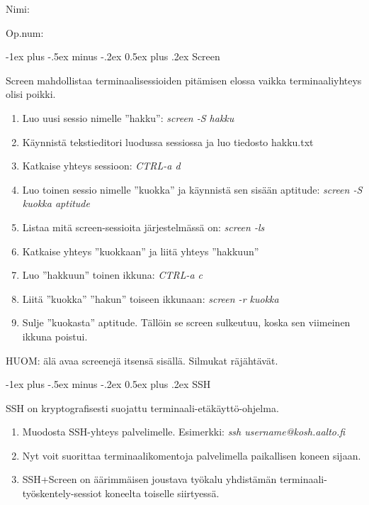 \documentclass[12pt,portrait,a4]{article}
\makeatletter
\renewcommand{\section}{\@startsection{section}{1}{0mm}%
                                {-1ex plus -.5ex minus -.2ex}%
                                {0.5ex plus .2ex}%
                                {\normalfont\large\bfseries}}
\makeatother
\begin{document}
\raggedbottom

\begin{multicols}{2}
\setlength{\premulticols}{1pt}
\setlength{\postmulticols}{1pt}
\setlength{\multicolsep}{1pt}
\setlength{\columnsep}{2pt}

Nimi:\hrulefill

Op.num:\hrulefill

\end{multicols}

\section{Screen}

Screen mahdollistaa terminaalisessioiden pitämisen elossa
vaikka terminaaliyhteys olisi poikki.

\begin{enumerate}
\item Luo uusi sessio nimelle ''hakku'': \emph{screen -S hakku}
\item Käynnistä tekstieditori luodussa sessiossa ja luo tiedosto hakku.txt
\item Katkaise yhteys sessioon: \emph{CTRL-a d}
\item Luo toinen sessio nimelle ''kuokka'' ja käynnistä sen sisään aptitude: \emph{screen -S kuokka aptitude}
\item Listaa mitä screen-sessioita järjestelmässä on: \emph{screen -ls}
\item Katkaise yhteys ''kuokkaan'' ja liitä yhteys ''hakkuun''
\item Luo ''hakkuun'' toinen ikkuna: \emph{CTRL-a c}
\item Liitä ''kuokka'' ''hakun'' toiseen ikkunaan: \emph{screen -r kuokka}
\item Sulje ''kuokasta'' aptitude.  Tällöin se screen sulkeutuu, koska sen
viimeinen ikkuna poistui.
\end{enumerate}

HUOM: älä avaa screenejä itsensä sisällä.  Silmukat räjähtävät.

\section{SSH}

SSH on kryptografisesti suojattu terminaali-etäkäyttö-ohjelma.

\begin{enumerate}
\item Muodosta SSH-yhteys palvelimelle.  Esimerkki: \emph{ssh username@kosh.aalto.fi}
\item Nyt voit suorittaa terminaalikomentoja palvelimella paikallisen koneen sijaan.
\item SSH+Screen on äärimmäisen joustava työkalu yhdistämän
terminaali-työskentely-sessiot koneelta toiselle siirtyessä.
\end{enumerate}
\end{document}
